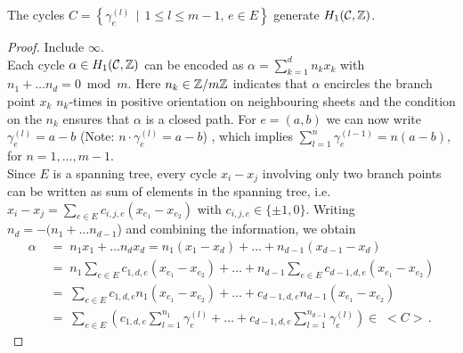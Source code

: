 \documentclass[main.tex]{subfiles}
\begin{document}
  \begin{thm}\label{thm:gen_set}
   The cycles $C = \left\{ \gamma_{e}^{(l)} \, \mid \, 1 \le l \le m-1, \, e \in E\right\}$ generate $H_1(\mathcal{C},\mathbb{Z})$.
  \end{thm}
  \begin{proof}
  \todo Include $\infty$.\\
   Each cycle $\alpha \in H_1(\mathcal{C},\mathbb{Z})$ can be encoded as $\alpha = \sum_{k = 1}^d n_kx_k$ with $n_1 + \dots n_d = 0 \bmod m$.
   Here $n_k \in \mathbb{Z}/m\mathbb{Z}$ indicates that $\alpha$ encircles the branch point $x_k$ $n_k$-times in positive orientation 
   on neighbouring sheets and the
   condition on the $n_k$ ensures that $\alpha$ is a closed path.
   For $e = (a,b)$ we can now write $\gamma_e^{(l)} = a - b$ (Note: $n \cdot \gamma_e^{(l)} = a-b$) , which implies $\sum_{l = 1}^n \gamma_e^{(l-1)} = n(a-b)$, 
   for $n = 1,\dots,m-1$. \\
   Since $E$ is a spanning tree, every cycle $x_i - x_j$ involving only two branch points can be written as sum of elements in the spanning tree,
   i.e. $x_i - x_j = \sum_{e \in E} c_{i,j,e} (x_{e_1}-x_{e_2})$ with $c_{i,j,e} \in \{ \pm 1, 0 \}$. Writing
   $n_d = -(n_1 + \dots n_{d-1}$) and
   combining the information, we obtain
   \begin{align*}
    \alpha \; & = \; n_1x_1 + \dots n_dx_d = n_1(x_1 - x_d) + \dots + n_{d-1}(x_{d-1} - x_d) \\
   &  = \;  n_1 \sum_{e \in E} c_{1,d,e} (x_{e_1}-x_{e_2}) + \dots + n_{d-1} \sum_{e \in E} c_{d-1,d,e} (x_{e_1}-x_{e_2}) \\
   & = \; \sum_{e \in E} c_{1,d,e} n_1 (x_{e_1}-x_{e_2}) + \dots + c_{d-1,d,e} n_{d-1} (x_{e_1}-x_{e_2}) \\
  &  = \; \sum_{e \in E}  \left( c_{1,d,e} \sum_{l = 1}^{n_1} \gamma_e^{(l)} + \dots +  c_{d-1,d,e} \sum_{l = 1}^{n_{d-1}} 
  \gamma_e^{(l)} \right) \in \; < C >\,.
   \end{align*}
  \end{proof}


  
  
  
\end{document}
